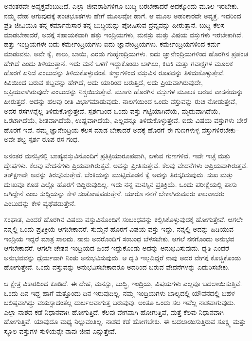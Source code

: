 ಅನಂತರವೇ ಅವ್ಯಕ್ತವೆಂಬುದಿದೆ. ಎಲ್ಲಾ ಜೀವರಾಶಿಗಳಿಗೂ ಬುದ್ಧಿ ಬರಬೇಕಾದರೆ ಅದ\-ಕ್ಕೊಂದು ಮೂಲ ಇರಬೇಕು. ನಮ್ಮ ದೇಹ ಆಗುವುದಕ್ಕೆ ಪಂಚಭೂತಗಳು ಹೇಗೆ ಮೂಲವೋ ಹಾಗೆ. ಆ ಮೂಲ ಅಹಂಕಾರವೇ ಅವ್ಯಕ್ತ. ಇದರಿಂದ ಪ್ರತಿ ಜೀವಿಯೂ ತನ್ನ ಕರ್ಮಾನುಸಾರ ತನ್ನ ಬುದ್ಧಿಯನ್ನು ಪೋಷಿಸುವ ದ್ರವ್ಯವನ್ನು ಹೀರುತ್ತಾನೆ. ಬುದ್ಧಿ ಕೆಲಸ ಮಾಡಬೇಕಾದರೆ, ಅದಕ್ಕೆ ಸಹಾಯಕವಾಗಿ ಹತ್ತು ಇಂದ್ರಿಯಗಳು, ಮನಸ್ಸು ಮತ್ತು ವಿಷಯ ವಸ್ತುಗಳು ಇರಬೇಕಾಗಿದೆ. ಹತ್ತು ಇಂದ್ರಿಯಗಳೇ ಐದು ಕರ್ಮೇಂದ್ರಿಯಗಳು ಐದು ಜ್ಞಾನೇಂದ್ರಿಯಗಳು. ಕರ್ಮೇಂದ್ರಿಯಗಳಿಂದ ಕರ್ಮ ಮಾಡುವನು. ಅವೇ ಕೈ, ಕಾಲು, ಬಾಯಿ, ಎರಡು ಗುಹ್ಯೇಂದ್ರಿಯಗಳು. ಐದು ಜ್ಞಾನೇಂದ್ರಿಯಗಳಿಂದ ಹೊರಗಿನ ಪ್ರಪಂಚ ಹೇಗಿದೆ ಎಂದು ತಿಳಿಯುತ್ತಾನೆ. ಇದು ಮನೆ ಒಳಗೆ ಇದ್ದುಕೊಂಡು ಬಾಗಿಲು, ಕಿಟಕಿ ಮತ್ತು ಗವಾಕ್ಷಗಳ ಮೂಲಕ ಹೊರಗೆ ಏನಿದೆ ಎಂಬುದನ್ನು ತಿಳಿದುಕೊಳ್ಳುವಂತೆ. ಕಣ್ಣುಗಳಿಂದ ವಸ್ತುವಿನ ರೂಪವನ್ನು ತಿಳಿದುಕೊಳ್ಳುತ್ತೇವೆ. ಕಿವಿಯಿಂದ ಬರುವ ಶಬ್ದವನ್ನು ಹೇಗಿದೆ, ಅದು ಯಾರಿಂದ ಬರುತ್ತಿದೆ, ಅದು ಪ್ರಿಯವಾಗಿರುವುದೇ, ಅಪ್ರಿಯವಾಗಿರುವುದೇ ಎಂಬುದನ್ನು ನಿಶ್ಚಯಿಸುತ್ತೇವೆ. ಮೂಗು ಹೊರಗಿನ ವಸ್ತುಗಳ ಮೂಲಕ ಬರುವ ವಾಸನೆಯನ್ನು ಹೀರುತ್ತದೆ. ಅದನ್ನು ಹಲವು ರೀತಿ ವಿಭಾಗಮಾಡುವುದು. ನಾಲಗೆಯಿಂದ ಒಂದು ವಸ್ತುವನ್ನು ರುಚಿ ನೋಡುತ್ತೇವೆ, ಅದರ ರಸಗಳನ್ನೆಲ್ಲ ತಿಳಿದುಕೊಳ್ಳುತ್ತೇವೆ. ಸ್ಪರ್ಶದಿಂದ ಒಂದು ವಸ್ತು ಗಟ್ಟಿಯಾಗಿದೆಯೆ, ಮೃದುವಾಗಿದೆಯೆ, ಒರಟಾಗಿದೆಯೆ, ಶೀತವಾಗಿದೆಯೆ, ಉಷ್ಣವಾಗಿದೆಯೆ, ಎಲ್ಲವನ್ನೂ ತಿಳಿದುಕೊಳ್ಳುತ್ತೇವೆ. ಐದು ವಿಷಯ ವಸ್ತುಗಳು ಬೇರೆ ಹೊರಗೆ ಇವೆ. ನಮ್ಮ ಜ್ಞಾನೇಂದ್ರಿಯ ಕೆಲಸ ಮಾಡ ಬೇಕಾದರೆ ಅದಕ್ಕೆ ಹೊರಗೆ ಈ ಗುಣಗಳುಳ್ಳ ವಸ್ತುಗಳಿರಬೇಕು–ಅವೇ ಶಬ್ದ ಸ್ಪರ್ಶ ರೂಪ ರಸ ಗಂಧ.

ಅನಂತರ ಮನಸ್ಸಿನಲ್ಲಿ ಬಾಹ್ಯವಸ್ತುವಿನೊಂದಿಗೆ ಪ್ರತಿಕ್ರಿಯಾರೂಪವಾಗಿ, ಏಳುವ ಗುಣಗಳಿವೆ. ಇವೇ ಇಚ್ಛೆ ಮತ್ತು ದ್ವೇಷಗಳು. ಕೆಲವು ವೇದನೆಗಳು ಪ್ರಿಯವಾಗಿರುತ್ತವೆ. ಅವನ್ನು ಪ್ರೀತಿಸುತ್ತೇವೆ. ಕೆಲವು ವೇದನೆಗಳು ಅಪ್ರಿಯವಾಗಿರುತ್ತವೆ. ತತ್​ಕ್ಷಣವೇ ಅವನ್ನು ತಿರಸ್ಕರಿಸುತ್ತೇವೆ. ಬೆಂಕಿಯನ್ನು ಮುಟ್ಟಿದೊಡನೆ ಕೈ ಅದನ್ನು ತಿರಸ್ಕರಿಸುವುದು. ಸುಖ ಮತ್ತು ದುಃಖವೂ ಕೂಡ ಎಲ್ಲೊ ಹೊರಗೆ ಬಿದ್ದಿರುವುದಿಲ್ಲ. ಇದು ನನ್ನ ಮನಸ್ಸಿನ ಪ್ರತಿಕ್ರಿಯೆ. ಒಂದು ಪರೀಕ್ಷೆಯಲ್ಲಿ ಪಾಸು ಆಗಿದ್ದೇನೆ ಎಂಬ ಸುದ್ದಿಯನ್ನು ಕೇಳಿ ಸಂತೋಷಪಡುತ್ತೇನೆ. ಯಾರೊ ನನಗೆ ಬೇಕಾಗಿರುವವರು ಕಾಲವಾದರು ಎಂಬುದನ್ನು ಕೇಳಿ ವ್ಯಥೆಪಡುತ್ತೇನೆ.

ಸಂಘಾತ, ಎಂದರೆ ಹೊರಗಿನ ವಿಷಯ ವಸ್ತುವಿನೊಂದಿಗೆ ಸಂಬಂಧವನ್ನು ಕಲ್ಪಿಸಿಕೊಳ್ಳುವುದಕ್ಕೆ ಹೋಗುತ್ತೇವೆ. ಆಗಲೇ ನನ್ನಲ್ಲಿ ಒಂದು ಪ್ರತಿಕ್ರಿಯೆ ಆಗಬೇಕಾದರೆ. ಸುಮ್ಮನೆ ಹೊರಗೆ ವಿಷಯ ವಸ್ತು ಇದ್ದು, ನನ್ನಲ್ಲಿ ಅದನ್ನು ಹಿಡಿಯುವ ಇಂದ್ರಿಯ ಇದ್ದರೆ ಮಾತ್ರ ಸಾಲದು. ನಾನು ಅದರೊಂದಿಗೆ ಸಂಬಂಧ ಬೆಳಸಬೇಕು. ಆಗಲೆ ನನಗೊಂದು ಅನುಭವ ಆಗಬೇಕಾದರೆ. ಆಗಲೇ ಚೇತನ ಇಂದ್ರಿಯದ ಹಿಂದೆ ಇದ್ದುಕೊಂಡು ಅದನ್ನು ಅನುಭವಿಸುವುದು. ಧೃತಿ ಎಂದರೆ ಅನುಭವವನ್ನು ಧೈರ್ಯವಾಗಿ ನಿಂತು ಅನುಭವಿಸುವುದು. ಆ ಧೃತಿ ಇಲ್ಲದಿದ್ದರೆ ನಾವು ಅದರ ವೇಗಕ್ಕೆ ಕೊಚ್ಚಿಕೊಂಡು ಹೋಗುತ್ತೇವೆ. ಒಂದು ವಸ್ತುವನ್ನು ಅನುಭವಿಸಬೇಕಾದರೂ ಅದರಿಂದ ಬರುವ ವೇದನೆಗಳನ್ನು ಎದುರಿಸಬೇಕು.

ಆ ಕ್ಷೇತ್ರ ವಿಕಾರದಿಂದ ಕೂಡಿದೆ. ಈ ದೇಹ, ಮನಸ್ಸು, ಬುದ್ಧಿ, ಇಂದ್ರಿಯ, ವಿಷಯಗಳು ಎಲ್ಲವೂ ಬದಲಾಯಿಸುತ್ತಿವೆ. ಒಂದು ದಿನ ಇದ್ದ ಹಾಗೆ ಮತ್ತೊಂದು ದಿನ ಇರುವುದಿಲ್ಲ. ನಮ್ಮ ಇಂದ್ರಿಯಗಳು ಬಾಲ್ಯದಲ್ಲಿ ಯೌವನದಲ್ಲಿ ಬಹಳ ಬಲಿಷ್ಠವಾಗಿದ್ದು ವಯಸ್ಸಾದಂತೆಲ್ಲ ದುರ್ಬಲವಾಗುತ್ತ ಬರುವುವು. ಅಂತೂ ಒಂದು ಸಲ ಇವೆಲ್ಲ ನಾಶವಾಗುವುದು. ಎಲ್ಲಾ ನಾಶದ ಕಡೆ ನಿಧಾನವಾಗಿ ಹೋಗುತ್ತಿದೆ. ಕೆಲವು ವೇಗವಾಗಿ ಹೋಗುತ್ತಿವೆ, ಮತ್ತೆ ಕೆಲವು ನಿಧಾನವಾಗಿ ಹೋಗುತ್ತಿವೆ. ಯಾವುದೂ ಮಧ್ಯ ನಿಲ್ಲುವಂತಿಲ್ಲ. ನಾಶದ ಕಡೆ ಹೋಗಬೇಕು. ಈ ಬದಲಾಯಿಸುತ್ತಿರುವ ಸೂಕ್ಷ್ಮ ಮತ್ತು ಸ್ಥೂಲ ವಸ್ತುಗಳ ಸುಳಿಯನ್ನೇ ನಾವು ಜೀವ ಎನ್ನುತ್ತೇವೆ.

